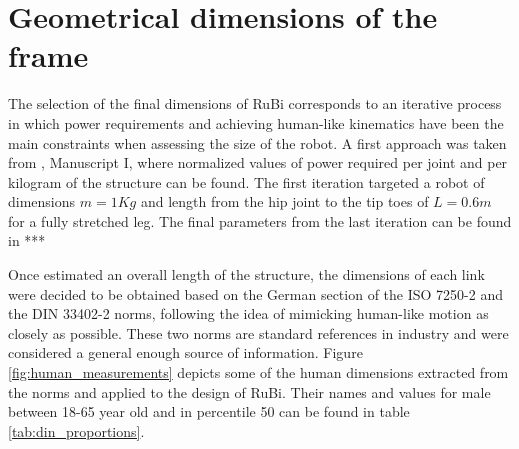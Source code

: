 
\section{Geometrical dimensions of the frame} %
\label{sec:dimensions}

The selection of the final dimensions of RuBi corresponds to an iterative process in which power requirements and achieving human-like kinematics have been the main constraints when assessing the size of the robot.
A first approach was taken from \cite{grimmer}, Manuscript I, where normalized values of power required per joint and per kilogram of the structure can be found.
The first iteration targeted a robot of dimensions $m = 1Kg$ and length from the hip joint to the tip toes of $L = 0.6 m$ for a fully stretched leg.
The final parameters from the last iteration can be found in ***%

Once estimated an overall length of the structure, the dimensions of each link were decided to be obtained based on the German section of the ISO 7250-2 \cite{iso_measurements} and the DIN 33402-2 \cite{din_measurements1} norms, following the idea of mimicking human-like motion as closely as possible.
These two norms are standard references in industry and were considered a general enough source of information.
Figure \ref{fig:human_measurements} depicts some of the human dimensions extracted from the norms and applied to the design of RuBi.
Their names and values for male between 18-65 year old and in percentile 50 can be found in table \ref{tab:din_proportions}.

